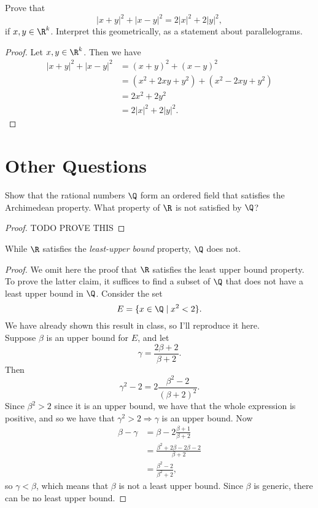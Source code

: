 \documentclass{assignment}
\begin{document}
\begin{question}[17]
  Prove that $$|x + y|^2 + |x - y|^2 = 2|x|^2 + 2|y|^2,$$ if $x,y\in\R^k$. Interpret this geometrically,
  as a statement about parallelograms.
\end{question}
\begin{proof}
  Let $x,y\in\R^k$. Then we have
  \begin{align*}
    |x+y|^2 + |x-y|^2 &= (x+y)^2 + (x-y)^2 \\
                      &= (x^2 + 2xy + y^2) + (x^2 - 2xy + y^2) \\
                      &= 2x^2 + 2y^2 \\
                      &= 2|x|^2 + 2|y|^2.
  \end{align*}
\end{proof}


\section*{Other Questions}
\begin{question}[1]
  Show that the rational numbers $\Q$ form an ordered field that satisfies the Archimedean property.
What property of $\R$ is not satisfied by $\Q$?
\end{question}

\begin{proof}
  TODO PROVE THIS
\end{proof}

\begin{theorem}
  While $\R$ satisfies the \emph{least-upper bound} property, $\Q$ does not.
\end{theorem}
\begin{proof}
  We omit here the proof that $\R$ satisfies the least upper bound property. To prove the latter claim,
it suffices to find a subset of $\Q$ that does not have a least upper bound in $\Q$. Consider the set
$$E = \{x\in\Q \mid x^2 < 2 \}.$$ We have already shown this result in class, so I'll reproduce it 
here. \\

Suppose $\beta$ is an upper bound for $E$, and let $$\gamma = \frac{2\beta + 2}{\beta + 2}.$$ Then
$$\gamma^2 - 2 = 2\frac{\beta^2 - 2}{(\beta + 2)^2}.$$ Since $\beta^2 > 2$ since it is an upper bound,
we have that the whole expression is positive, and so we have that $\gamma^2 > 2 \Rightarrow \gamma$ is 
an upper bound. Now 
\begin{align*}
  \beta - \gamma &= \beta - 2\frac{\beta + 1}{\beta + 2} \\
                 &= \frac{\beta^2 + 2\beta - 2\beta - 2}{\beta + 2} \\
                 &= \frac{\beta^2 - 2}{\beta^2 + 2},
\end{align*}
so $\gamma < \beta$, which means that $\beta$ is not a least upper bound. Since $\beta$ is generic,
there can be no least upper bound.
\end{proof}
\end{document}

